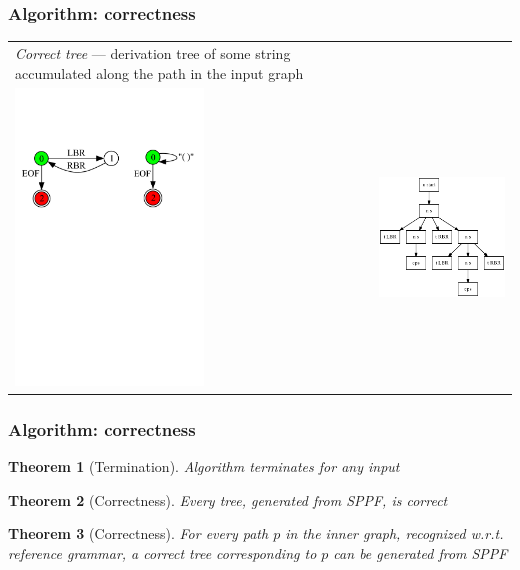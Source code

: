\documentclass{beamer}
\newtheorem{rutheorem}{Theorem}
\begin{document}
\begin{frame}
\transwipe[direction=90]
\frametitle{Algorithm: correctness}
\begin{tabular}{p{5.3cm} p{6.7cm}}
\emph{Correct tree} --- derivation tree of some string accumulated along the 
path in the input graph
&
\\
\includegraphics[width=5cm]{pictures/in31.pdf}
&
\includegraphics[width=6cm]{pictures/sppf2.eps}
\end{tabular}
\end{frame}


\begin{frame}
  \transwipe[direction=90]
  \frametitle{Algorithm: correctness}
  \begin{rutheorem}[Termination]
    Algorithm terminates for any input
  \end{rutheorem}
  
  \begin{rutheorem}[Correctness]
    Every tree, generated from SPPF, is correct
  \end{rutheorem}

  \begin{rutheorem}[Correctness]
    For every path $p$ in the inner graph, recognized w.r.t. reference
grammar, a correct tree corresponding to $p$ can be generated from SPPF
  \end{rutheorem}
\end{frame}
\end{document}

